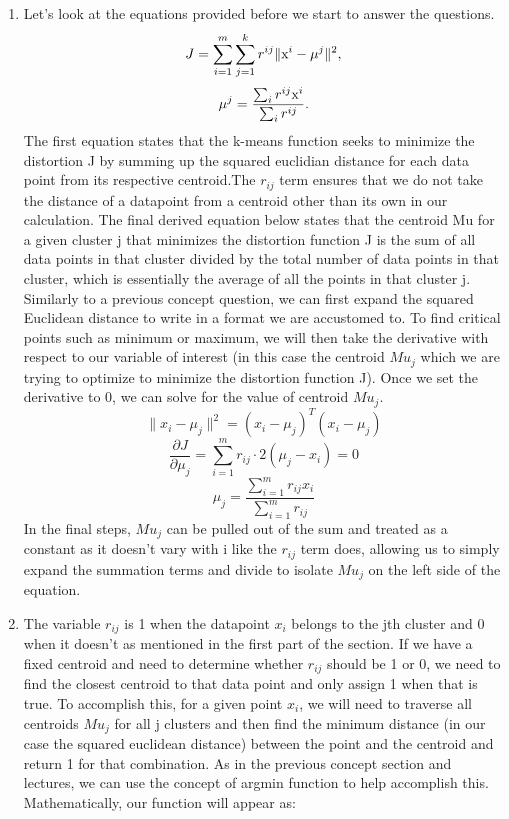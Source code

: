 \documentclass{article}
\begin{document}
\begin{enumerate}

\item Let's look at the equations provided before we start to answer the questions.
\begin{equation}
J =\sum_{i=1}^m\sum_{j=1}^k r^{ij} \|\text x^i-\mu^j\|^2,
\label{J_def}
\end{equation}
\begin{equation}
\mu^j=\frac{\sum_i r^{ij} \text x^i}{\sum_i r^{ij}}.
\end{equation}
The first equation states that the k-means function seeks to minimize the distortion J by summing up
the squared euclidian distance for each data point from its respective centroid.The $r_{ij}$ term ensures that
we do not take the distance of a datapoint from a centroid other than its own in our calculation. The final
derived equation below states that the centroid Mu for a given cluster j that minimizes the distortion
function J is the sum of all data points in that cluster divided by the total number of data points in that
cluster, which is essentially the average of all the points in that cluster j. Similarly to a previous concept
question, we can first expand the squared Euclidean distance to write in a format we are accustomed to. To
find critical points such as minimum or maximum, we will then take the derivative with respect to our variable
of interest (in this case the centroid $Mu_j$ which we are trying to optimize to minimize the distortion function
J). Once we set the derivative to 0, we can solve for the value of centroid $Mu_j$.
\begin{equation}
\| x_i - \mu_j \|^2 = (x_i - \mu_j)^T(x_i - \mu_j)
\end{equation}
\begin{equation}
\frac{\partial J}{\partial \mu_j} = \sum_{i=1}^{m} r_{ij} \cdot 2(\mu_j - x_i) = 0
\end{equation}
\begin{equation}
\mu_j = \frac{\sum_{i=1}^{m} r_{ij} x_i}{\sum_{i=1}^{m} r_{ij}}
\end{equation}
In the final steps, $Mu_j$ can be pulled out of the sum and treated as a constant as it doesn't vary with i
like the $r_{ij}$ term does, allowing us to simply expand the summation terms and divide to isolate $Mu_j$ on the
left side of the equation.

\item The variable $r_{ij}$ is 1 when the datapoint $x_i$ belongs to the jth cluster and 0 when it doesn't as
mentioned in the first part of the section. If we have a fixed centroid and need to determine whether
$r_{ij}$ should be 1 or 0, we need to find the closest centroid to that data point and only assign 1 when
that is true. To accomplish this, for a given point $x_i$, we will need to traverse all centroids $Mu_j$ for all
j clusters and then find the minimum distance (in our case the squared euclidean distance) between the point
and the centroid and return 1 for that combination. As in the previous concept section and lectures, we can use the
concept of argmin function to help accomplish this. Mathematically, our function will appear as:


\end{enumerate}
\end{document}
